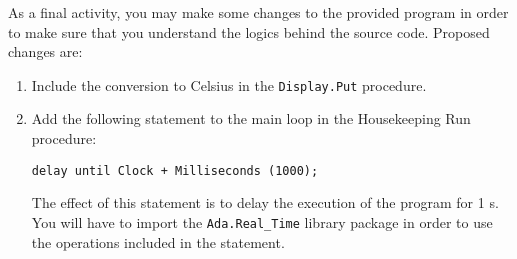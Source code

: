 As a final activity, you may make some changes to the provided program in order to make sure that you understand the logics behind the source code. Proposed changes are:

\begin{enumerate}
\item Include the conversion to Celsius in the {\tt Display.Put} procedure.
\item Add the following statement to the main loop in the Housekeeping Run procedure:

{\tt delay until Clock + Milliseconds (1000);}

The effect of this statement is to delay the execution of the program for 1 s. You will have to import the {\tt Ada.Real\_Time} library package in order to use the operations included in the statement.
\end{enumerate}
